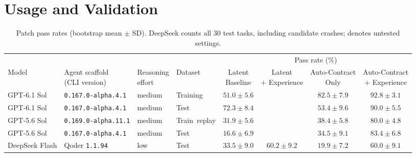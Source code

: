 \section{Usage and Validation}
\label{sec:usage}

\begin{table}[!t]
    \centering
    \caption{Patch pass rates (bootstrap mean $\pm$ SD). DeepSeek counts all 30 test tasks, including candidate crashes; \textemdash{} denotes untested settings.}
    \label{tab:tempoevo-main-evaluation}
    \small
    \setlength{\tabcolsep}{3pt}
    \begin{tabular*}{\textwidth}{@{\extracolsep{\fill}}llllcccc@{}}
        \toprule
        \multicolumn{4}{c}{} & \multicolumn{4}{c}{Pass rate (\%)} \\
        \cmidrule(lr){5-8}
        Model & \shortstack{Agent scaffold\\(CLI version)} & \shortstack{Reasoning\\effort}
        & Dataset & \shortstack{Latent\\Baseline}
        & \shortstack{Latent\\+ Experience}
        & \shortstack{Auto-Contract\\Only} & \shortstack{Auto-Contract\\+ Experience} \\
        \midrule
        GPT-6.1 Sol & \texttt{0.167.0-alpha.4.1} & medium & Training
        & $51.0 \pm 5.6$ & \textemdash{} & $82.5 \pm 7.9$ & {\boldmath$92.8 \pm 3.1$} \\
        GPT-6.1 Sol & \texttt{0.167.0-alpha.4.1} & medium & Test
        & $72.3 \pm 8.4$ & \textemdash{} & $53.4 \pm 9.6$ & {\boldmath$90.0 \pm 5.5$} \\
        \addlinespace
        GPT-5.6 Sol & \texttt{0.169.0-alpha.11.1} & medium & \mbox{Train replay}
        & $31.9 \pm 5.6$ & \textemdash{} & $38.4 \pm 5.8$ & {\boldmath$80.0 \pm 4.8$} \\
        GPT-5.6 Sol & \texttt{0.167.0-alpha.4.1} & medium & Test
        & $16.6 \pm 6.9$ & \textemdash{} & $34.5 \pm 9.1$ & {\boldmath$83.4 \pm 6.8$} \\
        \addlinespace
        DeepSeek Flash & Qoder \texttt{1.1.94} & low & Test
        & $33.5 \pm 9.0$ & {\boldmath$60.2 \pm 9.2$} & $19.9 \pm 7.2$ & {\boldmath$60.0 \pm 9.1$} \\
        \bottomrule
    \end{tabular*}
\end{table}

